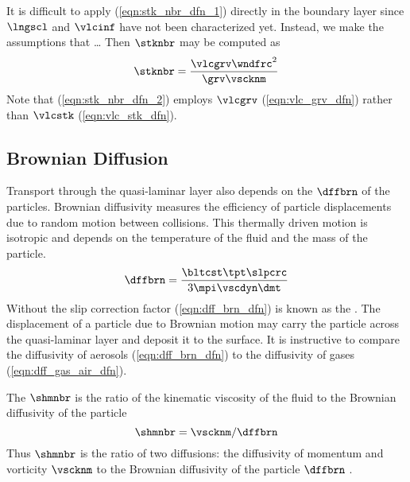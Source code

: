 \documentclass[12pt,twoside]{book}
\begin{document}
It is difficult to apply (\ref{eqn:stk_nbr_dfn_1}) directly in
the boundary layer since $\lngscl$ and $\vlcinf$ have not been 
characterized yet.
Instead, we make the assumptions that \ldots
Then $\stknbr$ may be computed as 
\begin{equation}
\stknbr = \frac{\vlcgrv \wndfrc^{2}}{\grv \vscknm}
\label{eqn:stk_nbr_dfn_2}
\end{equation}
Note that (\ref{eqn:stk_nbr_dfn_2}) employs $\vlcgrv$
(\ref{eqn:vlc_grv_dfn}) rather than $\vlcstk$
(\ref{eqn:vlc_stk_dfn}). 

\subsection[Brownian Diffusion]{Brownian Diffusion}\label{sxn:brn}
Transport through the quasi-laminar layer also depends on the
 $\dffbrn$ of the particles.
Brownian diffusivity measures the efficiency of particle displacements
due to random motion between collisions.
This thermally driven motion is isotropic and depends on the
temperature of the fluid and the mass of the particle.
\begin{equation}
\dffbrn = \frac{\bltcst \tpt \slpcrc}{3 \mpi \vscdyn \dmt } 
\label{eqn:dff_brn_dfn}
\end{equation}
Without the slip correction factor (\ref{eqn:dff_brn_dfn}) is known as
the .
The displacement of a particle due to Brownian motion may carry the
particle across the quasi-laminar layer and deposit it to the surface.
It is instructive to compare the diffusivity of aerosols
(\ref{eqn:dff_brn_dfn}) to the diffusivity of gases
(\ref{eqn:dff_gas_air_dfn}).

The  $\shmnbr$ is the ratio of the kinematic
viscosity of the fluid to the Brownian diffusivity of the particle
\begin{equation}
\shmnbr = \vscknm / \dffbrn
\label{eqn:shm_nbr_dfn}
\end{equation}
Thus $\shmnbr$ is the ratio of two diffusions: the diffusivity of
momentum and vorticity $\vscknm$ to the Brownian diffusivity of the
particle $\dffbrn$ \cite[]{Sli82}.
\end{document}
